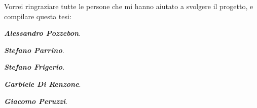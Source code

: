 
\label{101-chapter}
Vorrei ringraziare tutte le persone che mi hanno aiutato a svolgere il progetto, e compilare questa tesi:\\
\par{}\textbf{\textit{Alessandro Pozzebon}}.\\
\par{}\textbf{\textit{Stefano Parrino}}.\\
\par{}\textbf{\textit{Stefano Frigerio}}.\\
\par{}\textbf{\textit{Garbiele Di Renzone}}.\\
\par{}\textbf{\textit{Giacomo Peruzzi}}.\\
